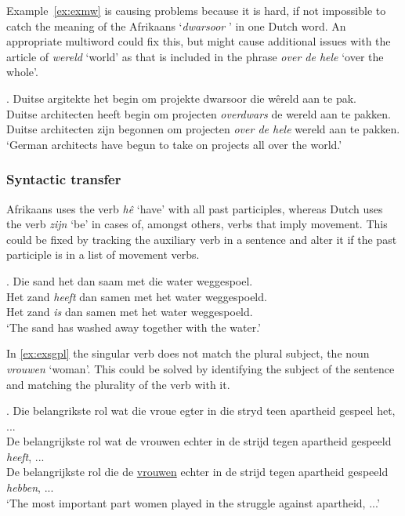 \documentclass[11pt]{article}
\begin{document}
Example~\ref{ex:exmw} is causing problems because it is hard, if not impossible to catch the meaning of the 
Afrikaans `{\em dwarsoor}  ' in one Dutch word. An appropriate multiword could fix this, but might 
cause additional issues with the article of {\em wereld} `world' as that is included in the 
phrase {\em over de hele} `over the whole'.

\ex. \label{ex:exmw} 
    Duitse argitekte het begin om projekte dwarsoor die wêreld aan te pak. \\
    Duitse architecten heeft begin om projecten {\em overdwars} de wereld aan te pakken. \\
    Duitse architecten zijn begonnen om projecten {\em over de hele} wereld aan te pakken. \\
   `German architects have begun to take on projects all over the world.'

\subsubsection{Syntactic transfer}

Afrikaans uses the verb {\em hê} `have' with all past participles, whereas Dutch uses the 
verb {\em zijn} `be' in cases of, amongst others, verbs that imply movement. This could be fixed 
by tracking the auxiliary verb in a sentence and alter it if the past participle is in a list
of movement verbs.

\ex. \label{ex:exserhaverl} 
    Die sand het dan saam met die water weggespoel. \\
    Het zand {\em heeft} dan samen met het water weggespoeld. \\
    Het zand {\em is} dan samen met het water weggespoeld. \\
   `The sand has washed away together with the water.'

In \ref{ex:exsgpl} the singular verb does not match the plural subject, the noun {\em vrouwen} `woman'. This 
could be solved by identifying the subject of the sentence and matching the plurality 
of the verb with it.

\ex. \label{ex:exsgpl} 
    Die belangrikste rol wat die vroue egter in die stryd teen apartheid gespeel het, ... \\
    De belangrijkste rol wat de vrouwen echter in de strijd tegen apartheid gespeeld {\em heeft}, ... \\
    De belangrijkste rol die de \underline{vrouwen} echter in de strijd tegen apartheid gespeeld {\em hebben}, ... \\
    `The most important part women played in the struggle against apartheid, ...' 
\end{document}
